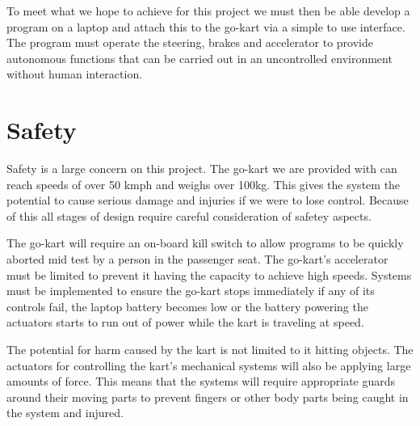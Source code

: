 To meet what we hope to achieve for this project we must then be able develop a program on a laptop and attach this to the go-kart via a simple to use interface. The program must operate the steering, brakes and accelerator to provide autonomous functions that can be carried out in an uncontrolled environment without human interaction. 

\section{Safety}
Safety is a large concern on this project. The go-kart we are provided with can reach speeds of over 50 kmph and weighs over 100kg. This gives the system the potential to cause serious damage and injuries if we were to lose control. Because of this all stages of design require careful consideration of safetey aspects.

The go-kart will require an on-board kill switch to allow programs to be quickly aborted mid test by a person in the passenger seat. The go-kart's accelerator must be limited to prevent it having the capacity to achieve high speeds. Systems must be implemented to ensure the go-kart stops immediately if any of its controls fail, the laptop battery becomes low or the battery powering the actuators starts to run out of power while the kart is traveling at speed.

The potential for harm caused by the kart is not limited to it hitting objects. The actuators for controlling the kart's mechanical systems will also be applying large amounts of force. This means that the systems will require appropriate guards around their moving parts to prevent fingers or other body parts being caught in the system and injured.

